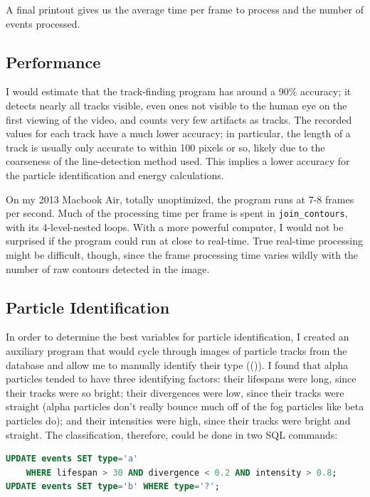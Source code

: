 \documentclass[notitlepage,12pt]{article}
\newcommand{\mycite}[1]{((\bibentry{#1}))}
\begin{document}
A final printout gives us the average time per frame to process and the number of events processed.

\subsection{Performance}

I would estimate that the track-finding program has around a 90\% accuracy; it detects nearly all tracks visible, even ones not visible to the human eye on the first viewing of the video, and counts very few artifacts as tracks.  The recorded values for each track have a much lower accuracy; in particular, the length of a track is usually only accurate to within 100 pixels or so, likely due to the coarseness of the line-detection method used.  This implies a lower accuracy for the particle identification and energy calculations.

On my 2013 Macbook Air, totally unoptimized, the program runs at 7-8 frames per second.  Much of the processing time per frame is spent in \texttt{join\_contours}, with its 4-level-nested loops.  With a more powerful computer, I would not be surprised if the program could run at close to real-time.  True real-time processing might be difficult, though, since the frame processing time varies wildly with the number of raw contours detected in the image.

\subsection{Particle Identification}

In order to determine the best variables for particle identification, I created an auxiliary program that would cycle through images of particle tracks from the database and allow me to manually identify their type \mycite{wayne}.  I found that alpha particles tended to have three identifying factors: their lifespans were long, since their tracks were so bright; their divergences were low, since their tracks were straight (alpha particles don't really bounce much off of the fog particles like beta particles do); and their intensities were high, since their tracks were bright and straight.  The classification, therefore, could be done in two SQL commands:
\begin{lstlisting}[language=SQL]
UPDATE events SET type='a' 
    WHERE lifespan > 30 AND divergence < 0.2 AND intensity > 0.8;
UPDATE events SET type='b' WHERE type='?';
\end{lstlisting}
\end{document}
